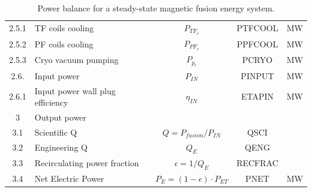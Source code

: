 \begin{table}[ht!]
\begin{tabular}{|c|p{5cm}|c|c|c|}
2.5.1	&	TF coils cooling	&	$P_{{TF}_c}$	&	PTFCOOL	&	MW \\
2.5.2	&	PF coils cooling	&	$P_{{PF}_c}$	&	PPFCOOL	&	MW \\
2.5.3	&	Cryo vacuum pumping	&	$P_{{p}_c}$	&	PCRYO	&	MW \\
2.6.	& Input power 	& $P_{IN}$	&	PINPUT	&	MW \\
2.6.1	& Input power wall plug efficiency  &	$\eta_{IN}$ & ETAPIN	&	MW \\
\hline								
3	&	Output power	&		&		&	\\
\hline
3.1	&	Scientific Q	&	$Q = P_{{fusion}}/P_{{IN}}$	&	QSCI	&	\\
3.2	&	Engineering Q	&	$Q_{{E}}$	&	QENG	&	\\
3.3	&	Recirculating power fraction	&	$\epsilon = 1/Q_{{E}}$	&	RECFRAC	&	\\
3.4	&	Net Electric Power	&	$P_{{E}} = (1 - \epsilon) \cdot P_{{ET}}$	&	PNET	&	MW \\
\hline								
\end{tabular}	
\caption{Power balance for a steady-state magnetic fusion energy system.}
\label{tab:powerbalance}
\end{table}
